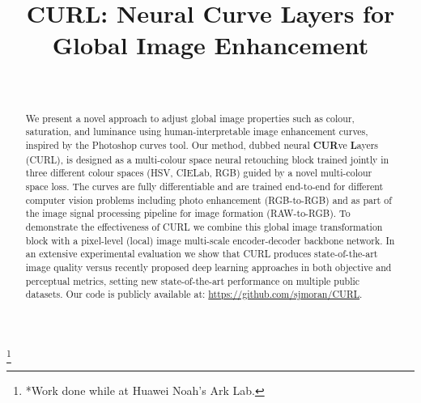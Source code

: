 \documentclass[a4paper,conference]{IEEEtran}
\newcommand\blfootnote[1]{\begingroup
  \renewcommand\thefootnote{}\footnote{#1}\addtocounter{footnote}{-1}\endgroup
}
\begin{document}
\title{CURL: Neural Curve Layers for  Global Image Enhancement}








\author{
 \\
\IEEEauthorblockN{} }




\newcommand{\steven}[1]{{\textcolor{stevencolor}{[SGM #1]}}}
\newcommand\sgm[1] {\steven{#1}}

\newcommand{\sean}[1]{{\textcolor{seancolor}{[SM #1]}}}
\newcommand\sm[1] {\sean{#1}}

\newcommand{\greg}[1]{{\textcolor{gregcolor}{[GS #1]}}}
\newcommand\gs[1] {\greg{#1}}












\maketitle
\blfootnote{
*Work done while at Huawei Noah's Ark Lab.
}
\begin{abstract}
We  present  a  novel  approach  to  adjust  global  image  properties such as colour, saturation, and luminance using human-interpretable image enhancement curves, inspired by the Photoshop curves tool. Our method, dubbed neural \textbf{CUR}ve \textbf{L}ayers (CURL), is designed as a multi-colour space neural retouching block trained jointly in three different colour spaces (HSV, CIELab, RGB) guided by a novel multi-colour space loss. The curves are fully differentiable and are trained end-to-end for different computer vision problems including photo enhancement (RGB-to-RGB) and as part of the image signal processing pipeline for image formation (RAW-to-RGB). To demonstrate the effectiveness of CURL we combine this global image transformation block with a pixel-level (local) image multi-scale encoder-decoder backbone network. In an extensive experimental evaluation we show that CURL produces state-of-the-art image quality versus recently proposed deep learning approaches in both objective and perceptual metrics, setting new state-of-the-art performance on multiple public datasets. Our code is publicly available at: \url{https://github.com/sjmoran/CURL}.
\end{abstract}
\end{document}
